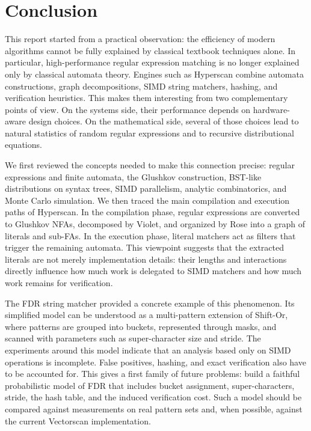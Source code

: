 \chapter{Conclusion}
\label{chap:conclusion}

This report started from a practical observation: the efficiency of modern algorithms cannot be fully explained by classical textbook techniques alone. In particular, high-performance regular expression matching is no longer explained only by classical automata theory. Engines such as Hyperscan combine automata constructions, graph decompositions, SIMD string matchers, hashing, and verification heuristics. This makes them interesting from two complementary points of view. On the systems side, their performance depends on hardware-aware design choices. On the mathematical side, several of those choices lead to natural statistics of random regular expressions and to recursive distributional equations.

We first reviewed the concepts needed to make this connection precise: regular expressions and finite automata, the Glushkov construction, BST-like distributions on syntax trees, SIMD parallelism, analytic combinatorics, and Monte Carlo simulation. We then traced the main compilation and execution paths of Hyperscan. In the compilation phase, regular expressions are converted to Glushkov NFAs, decomposed by Violet, and organized by Rose into a graph of literals and sub-FAs. In the execution phase, literal matchers act as filters that trigger the remaining automata. This viewpoint suggests that the extracted literals are not merely implementation details: their lengths and interactions directly influence how much work is delegated to SIMD matchers and how much work remains for verification.

The FDR string matcher provided a concrete example of this phenomenon. Its simplified model can be understood as a multi-pattern extension of Shift-Or, where patterns are grouped into buckets, represented through masks, and scanned with parameters such as super-character size and stride. The experiments around this model indicate that an analysis based only on SIMD operations is incomplete. False positives, hashing, and exact verification also have to be accounted for. This gives a first family of future problems: build a faithful probabilistic model of FDR that includes bucket assignment, super-characters, stride, the hash table, and the induced verification cost. Such a model should be compared against measurements on real pattern sets and, when possible, against the current Vectorscan implementation.

